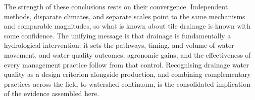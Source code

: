 The strength of these conclusions rests on their convergence. Independent
methods, disparate climates, and separate scales point to the same mechanisms
and comparable magnitudes, so what is known about tile drainage is known with
some confidence. The unifying message is that drainage is fundamentally a
hydrological intervention: it sets the pathways, timing, and volume of water
movement, and water-quality outcomes, agronomic gains, and the effectiveness of
every management practice follow from that control. Recognising drainage water
quality as a design criterion alongside production, and combining complementary
practices across the field-to-watershed continuum, is the consolidated
implication of the evidence assembled here.